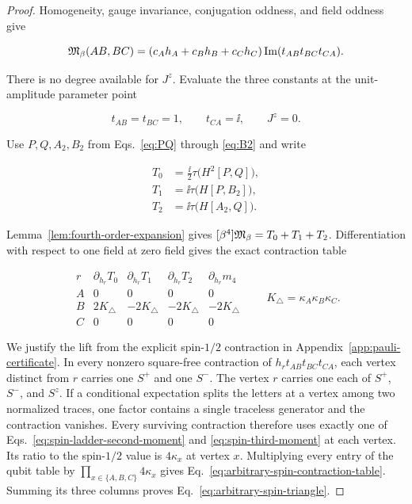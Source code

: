 \begin{proof}
Homogeneity, gauge invariance, conjugation oddness, and field oddness give

\begin{equation}
 [\beta^4]\Mmod_\beta(AB,BC)
 =(c_Ah_A+c_Bh_B+c_Ch_C)
 \operatorname{Im}(t_{AB}t_{BC}t_{CA}).
 \label{eq:triangle-arbitrary-classification}
\end{equation}

There is no degree available for $J^z$.  Evaluate the three constants at the
unit-amplitude parameter point

\begin{equation}
 t_{AB}=t_{BC}=1,
 \qquad
 t_{CA}=\ii,
 \qquad
 J^z=0.
 \label{eq:arbitrary-triangle-point}
\end{equation}

Use $P,Q,A_2,B_2$ from Eqs.~\eqref{eq:PQ} through \eqref{eq:B2} and write

\begin{align}
 T_0&=\frac{\ii}{2}\tau\bigl(H^2[P,Q]\bigr),
 \label{eq:triangle-T0}\\
 T_1&=\ii\tau\bigl(H[P,B_2]\bigr),
 \label{eq:triangle-T1}\\
 T_2&=\ii\tau\bigl(H[A_2,Q]\bigr).
 \label{eq:triangle-T2}
\end{align}

Lemma~\ref{lem:fourth-order-expansion} gives
$[\beta^4]\mathfrak{M}_\beta=T_0+T_1+T_2$.  Differentiation with respect to one
field at zero field gives the exact contraction table

\begin{equation}
\begin{array}{c|ccc|c}
 r&\partial_{h_r}T_0&\partial_{h_r}T_1&\partial_{h_r}T_2
 &\partial_{h_r}m_4\\
 \hline
 A&0&0&0&0\\
 B&2K_\triangle&-2K_\triangle&-2K_\triangle&-2K_\triangle\\
 C&0&0&0&0
\end{array}
\qquad
K_\triangle=\kappa_A\kappa_B\kappa_C.
 \label{eq:arbitrary-spin-contraction-table}
\end{equation}

We justify the lift from the explicit spin-$1/2$ contraction in
Appendix~\ref{app:pauli-certificate}.  In every nonzero square-free
contraction of $h_r t_{AB}t_{BC}t_{CA}$, each vertex distinct from $r$
carries one $S^+$ and one $S^-$.  The vertex $r$ carries one each of
$S^+$, $S^-$, and $S^z$.  If a conditional expectation splits the letters
at a vertex among two normalized traces, one factor contains a single
traceless generator and the contraction vanishes.  Every surviving
contraction therefore uses exactly one of
Eqs.~\eqref{eq:spin-ladder-second-moment} and
\eqref{eq:spin-third-moment} at each vertex.  Its ratio to the spin-$1/2$
value is $4\kappa_x$ at vertex $x$.  Multiplying every entry of the qubit
table by
$\prod_{x\in\{A,B,C\}}4\kappa_x$ gives
Eq.~\eqref{eq:arbitrary-spin-contraction-table}.  Summing its three columns
proves Eq.~\eqref{eq:arbitrary-spin-triangle}.
\end{proof}

